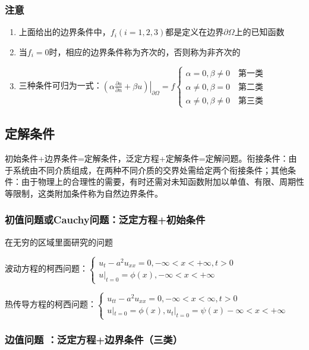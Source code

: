 \subsubsection{注意}
\begin{enumerate}
	\item 上面给出的边界条件中，\(f_i(i=1,2,3)\)都是定义在边界\(\partial\Omega\)上的已知函数
	\item 当\(f_i=0\)时，相应的边界条件称为齐次的，否则称为非齐次的
	\item 三种条件可归为一式：\(\left.\left(\alpha\frac{\partial u}{\partial n}+\beta u\right)\right|_{\partial\Omega}=f\begin{cases}
		\alpha=0,\beta\neq0\quad\text{第一类}\\
		\alpha\neq0,\beta=0\quad\text{第二类}\\
		\alpha\neq0,\beta\neq0\quad\text{第三类}
	\end{cases}\)
\end{enumerate}

\subsection{定解条件}

初始条件+边界条件=定解条件，泛定方程+定解条件=定解问题。衔接条件：由于系统由不同介质组成，在两种不同介质的交界处需给定两个衔接条件；其他条件：由于物理上的合理性的需要，有时还需对未知函数附加以单值、有限、周期性等限制，这类附加条件称为自然边界条件。

\subsubsection{初值问题或Cauchy问题：泛定方程+初始条件}

在无穷的区域里面研究的问题

波动方程的柯西问题：\(\begin{cases}u_t-a^2u_{xx}=0,-\infty<x<+\infty,t>0\\
	u|_{t=0}=\phi(x),-\infty<x<+\infty\end{cases}\)

热传导方程的柯西问题：\(\begin{cases}u_{tt}-a^2u_{xx}=0,-\infty<x<\infty,t>0\\
	u|_{t=0}=\phi(x),{u}_t|_{t=0}=\psi(x)-\infty<x<+\infty\end{cases}\)

\subsubsection{边值问题 ：泛定方程+边界条件（三类）}

